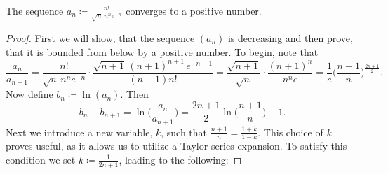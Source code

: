 \documentclass[10pt,a4paper]{amsart}
\begin{document}
\begin{lemma}
    The sequence $\displaystyle a_n \coloneqq \frac{n!}{\sqrt{n}\,n^ne^{-n}}$ 
    converges to a positive number.
\end{lemma}

\begin{proof}
    First we will show, that the sequence $(a_n)$ is decreasing and then prove, that it is bounded from below by a positive number. To begin, note that
    \[
        \frac{a_n}{a_{n+1}} = \frac{n!}{\sqrt{n}\,n^ne^{-n}} \cdot \frac{\sqrt{n+1}\,(n+1)^{n+1}\,e^{-n-1}}{(n+1)n!} =
        \frac{\sqrt{n+1}}{\sqrt{n}} \cdot \frac{(n+1)^n}{n^n e} =
        \frac{1}{e} \biggl(\frac{n+1}{n} \biggr)^\frac{2n+1}{2}.
    \]
    Now define $b_n \coloneqq \ln(a_n)$. Then
    \[
        b_n - b_{n+1} = \ln\biggl( \frac{a_n}{a_{n+1}} \biggr) = 
        \frac{2n+1}{2} \ln\biggl( \frac{n+1}{n} \biggr) - 1.
    \]
    Next we introduce a new variable, $k$, such that $\frac{n+1}{n} = \frac{1+k}{1-k}$. This choice of $k$ proves useful, as it allows us to utilize a Taylor series expansion. To satisfy this condition we set $k \coloneqq \frac{1}{2n+1}$, leading to the following:


\end{proof}
\end{document}
